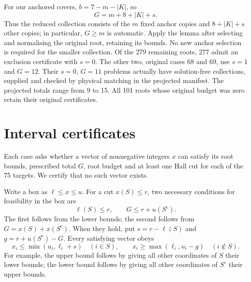 \documentclass[11pt]{article}
\theoremstyle{remark}
\begin{document}
For our anchored covers, $b=7-m-|K|$, so
\[
 G=m+8+|K|+s.
\]
Thus the reduced collection consists of the $m$ fixed anchor copies and
$8+|K|+s$ other copies; in particular, $G\ge m$ is automatic. Apply the lemma
after selecting and normalising the original root, retaining its bounds.
No new anchor selection is required for the smaller collection.
Of the 279 remaining roots, 277 admit an exclusion certificate with $s=0$. The other two, original
cases 68 and 69, use $s=1$ and $G=12$. Their $s=0$, $G=11$ problems actually
have solution-free collections, supplied and checked by physical matching in
the projected manifest. The projected totals range from 9 to 15. All 101 roots
whose original budget was zero retain their original certificates.

\section{Interval certificates}\label{sec:certificates}
Each case asks whether a vector of nonnegative integers $x$ can satisfy its
root bounds, prescribed total $G$, root budget and at least one Hall cut for each of
the 75 targets. We certify that no such vector exists.

Write a box as $\ell\le x\le u$. For a cut $x(S)\le r$, two necessary
conditions for feasibility in the box are
\begin{equation}\label{eq:possible}
  \ell(S)\le r,\qquad G\le r+u(S^c).
\end{equation}
The first follows from the lower bounds; the second follows from
$G=x(S)+x(S^c)$. When they hold, put
$s=r-\ell(S)$ and $g=r+u(S^c)-G$. Every satisfying vector obeys
\begin{equation}\label{eq:refine}
 x_i\le\min(u_i,\ell_i+s)\quad(i\in S),\qquad
 x_i\ge\max(\ell_i,u_i-g)\quad(i\notin S).
\end{equation}
For example, the upper bound follows by giving all other coordinates of $S$
their lower bounds; the lower bound follows by giving all other coordinates
of $S^c$ their upper bounds.
\end{document}
